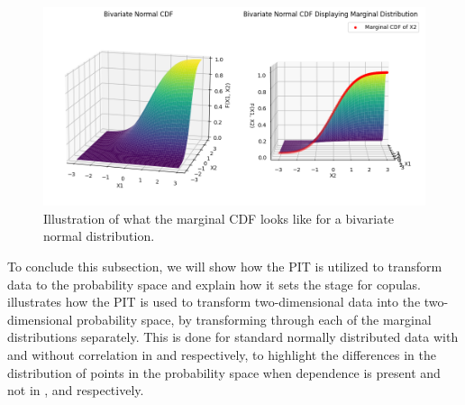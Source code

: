 \begin{figure}
    \centering
    \includegraphics[width=1\linewidth]{3Theory/pictures/MarginalIllustrated.png}
    \caption{Illustration of what the marginal \gls{CDF} looks like for a bivariate normal distribution.   }
    \label{fig:MarginalCDF}
\end{figure}


To conclude this subsection, we will show how the \gls{PIT} is utilized to transform data to the probability space and explain how it sets the stage for copulas.  illustrates how the \gls{PIT} is used to transform two-dimensional data into the two-dimensional probability space, by transforming through each of the marginal distributions separately. This is done for standard normally distributed data with and without correlation in  and  respectively, to highlight the differences in the distribution of points in the probability space when dependence is present and not in , and  respectively.


